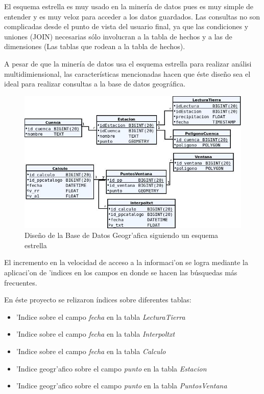 El esquema estrella es muy usado en la miner\'ia de datos pues es muy simple de entender y es muy veloz para acceder a los datos guardados. 
Las consultas no son complicadas desde el punto de vista del usuario final, ya que las condiciones y uniones (JOIN) necesarias s\'olo 
involucran a la tabla de hechos y a las de dimensiones (Las tablas que rodean a la tabla de hechos).

A pesar de que la miner\'ia de datos usa el esquema estrella para realizar an\'alisi multidimiensional, las caracter\'isticas mencionadas 
hacen que \'este dise\~no sea el ideal para realizar consultas a la base de datos geogr\'afica. 


\begin{figure}[h!]
 \centering
 \includegraphics[width=150mm]{./imagenes/DataBase.jpg}
 \caption{Dise\~no de la Base de Datos Geogr'afica siguiendo un esquema estrella}
\end{figure}

El incremento en la velocidad de acceso a la informaci'on se logra mediante la aplicaci'on de 'indices en los campos en donde
se hacen las b\'usquedas m\'as frecuentes.

En \'este proyecto se relizaron \'indices sobre diferentes tablas:
\begin{itemize}
 \item 'Indice sobre el campo \textit{fecha} en la tabla \textit{LecturaTierra}  
  \item 'Indice sobre el campo \textit{fecha} en la tabla \textit{Interpoltxt}
  \item 'Indice sobre el campo \textit{fecha} en la tabla \textit{Calculo}
  \item 'Indice geogr'afico sobre el campo \textit{punto} en la tabla \textit{Estacion}
  \item 'Indice geogr'afico sobre el campo \textit{punto} en la tabla \textit{PuntosVentana}
\end{itemize}



